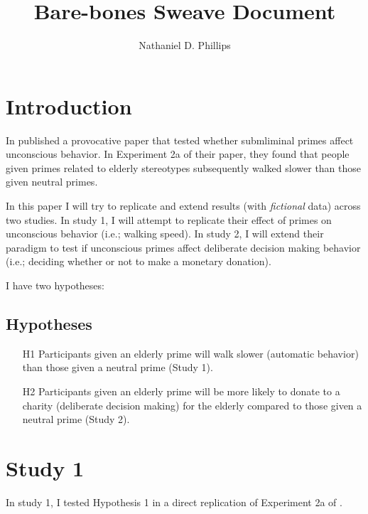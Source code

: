 \documentclass[a4paper,man,natbib,floatsintext]{apa6}\usepackage[]{graphicx}\usepackage[]{color}
\title{Bare-bones Sweave Document}
\author{Nathaniel D. Phillips}
\affiliation{University of Basel}
\begin{document}
\maketitle





\section{Introduction}

In \cite{bargh1996automaticity} published a provocative paper that tested whether submliminal primes affect unconscious behavior. In Experiment 2a of their paper, they found that people given primes related to elderly stereotypes subsequently walked slower than those given neutral primes.

In this paper I will try to replicate and extend results (with \emph{fictional} data) across two studies. In study 1, I will attempt to replicate their effect of primes on unconscious behavior (i.e.; walking speed). In study 2, I will extend their paradigm to test if unconscious primes affect deliberate decision making behavior (i.e.; deciding whether or not to make a monetary donation).

I have two hypotheses:

\subsection{Hypotheses}

\begin{enumerate}

  \item[H1] Participants given an elderly prime will walk slower (automatic behavior) than those given a neutral prime (Study 1).
  \item[H2] Participants given an elderly prime will be more likely to donate to a charity (deliberate decision making) for the elderly compared to those given a neutral prime (Study 2).

\end{enumerate}

\section{Study 1}

In study 1, I tested Hypothesis 1 in a direct replication of Experiment 2a of \cite{bargh1996automaticity}.
\end{document}
